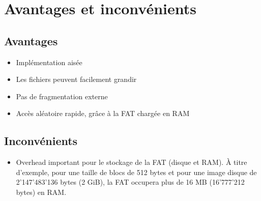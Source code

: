 \documentclass[a4paper, 12pt]{article}
\begin{document}
\section{Avantages et inconvénients}
\subsection{Avantages}
\begin{itemize}
	\item Implémentation aisée
	\item Les fichiers peuvent facilement grandir
	\item Pas de fragmentation externe
	\item Accès aléatoire rapide, grâce à la FAT chargée en RAM
\end{itemize}
\subsection{Inconvénients}
\begin{itemize}
	\item Overhead important pour le stockage de la FAT (disque et RAM). À titre d'exemple, pour une taille de 
	blocs de 512 bytes et pour une image disque de 2'147'483'136 bytes (2 GiB), la FAT occupera plus de 16 MB 
	(16'777'212 bytes) en RAM.
\end{itemize}
\end{document}

